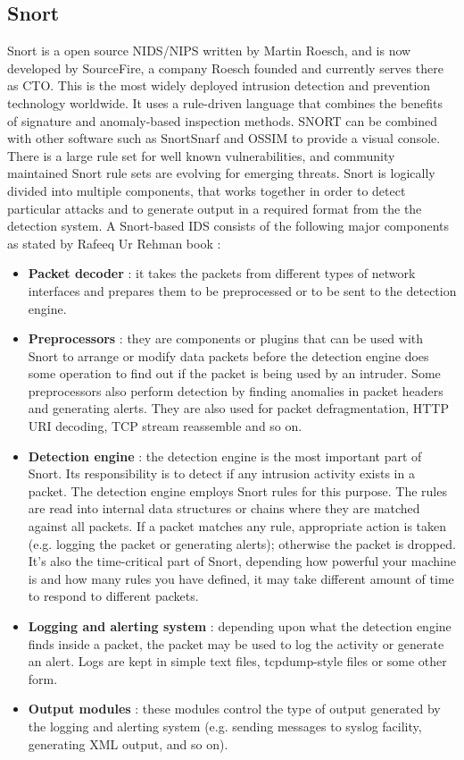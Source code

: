 \documentclass[11pt]{article}
\begin{document}
\subsection{Snort}
Snort is a open source NIDS/NIPS written by Martin Roesch, and is now developed by SourceFire, a company Roesch founded and currently serves there as CTO. This is the most widely deployed intrusion detection and prevention technology worldwide. It uses a rule-driven language that combines the benefits of signature and anomaly-based inspection methods. SNORT can be combined with other software such as SnortSnarf and OSSIM to provide a visual console. There is a large rule set for well known vulnerabilities, and community maintained Snort rule sets are evolving for emerging threats. Snort is logically divided into multiple components, that works together in order to detect particular attacks and to generate output in a required format from the the detection system. A Snort-based IDS consists of the following major components as stated by  Rafeeq Ur Rehman book \cite{snort} :
\begin{itemize}
\item \textbf{Packet decoder} : it takes the packets from different types of network interfaces and prepares them to be preprocessed or to be sent to the detection engine.
\item \textbf{Preprocessors} : they are components or plugins that can be used with Snort to arrange or modify data packets before the detection engine does some operation to find out if the packet is being used by an intruder. Some preprocessors also perform detection by finding anomalies in packet headers and generating alerts. They are also used for packet defragmentation, HTTP URI decoding, TCP stream reassemble and so on.
\item \textbf{Detection engine} : the detection engine is the most important part of Snort. Its responsibility is to detect if any intrusion activity exists in a packet. The detection engine employs Snort rules for this purpose. The rules are read into internal data structures or chains where they are matched against all packets. If a packet matches any rule, appropriate action is taken (e.g. logging the packet or generating alerts); otherwise the packet is dropped. It's also the time-critical part of Snort, depending how powerful your machine is and how many rules you have defined, it may take different amount of time to respond to different packets. 
\item \textbf{Logging and alerting system} : depending upon what the detection engine finds inside a packet, the packet may be used to log the activity or generate an alert. Logs are kept in simple text files, tcpdump-style files or some other form.
\item \textbf{Output modules} : these modules control the type of output generated by the logging and alerting system (e.g. sending messages to syslog facility, generating XML output, and so on).
\end{itemize}
\end{document}
